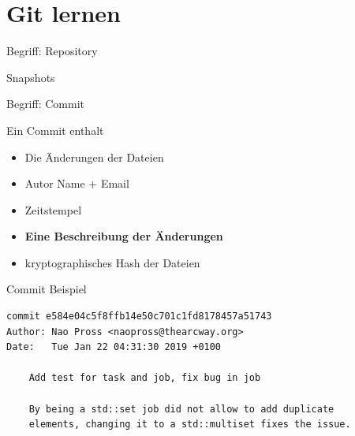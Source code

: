\section{Git lernen}

\begin{frame}{Begriff: Repository}
\end{frame}

\begin{frame}{Snapshots}
    \begin{center}\end{center}
\end{frame}

\begin{frame}{Begriff: Commit}
    \begin{block}{Ein Commit enthalt}
    \begin{itemize}
        \item Die \"Anderungen der Dateien \pause
        \item Autor Name + Email \pause
        \item Zeitstempel \pause
        \item \textbf{Eine Beschreibung der \"Anderungen} \pause
        \item kryptographisches Hash der Dateien \pause
    \end{itemize}   
    \end{block}
\end{frame}

\begin{frame}[fragile]{Commit Beispiel}
    \centering\footnotesize
    \begin{verbatim}
commit e584e04c5f8ffb14e50c701c1fd8178457a51743
Author: Nao Pross <naopross@thearcway.org>
Date:   Tue Jan 22 04:31:30 2019 +0100

    Add test for task and job, fix bug in job

    By being a std::set job did not allow to add duplicate
    elements, changing it to a std::multiset fixes the issue.

    \end{verbatim}
\end{frame}

